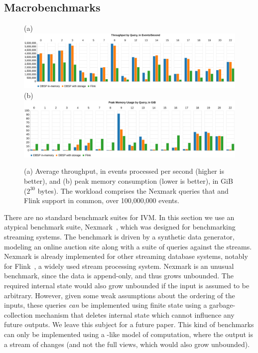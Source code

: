 \subsection{Macrobenchmarks}\label{sec:macrobenchmarks}

\begin{figure}
  (a) \includegraphics[width=.95\textwidth]{graph/throughput} \\
  (b) \includegraphics[width=.95\textwidth]{graph/memory} \\
  \caption{(a) Average throughput, in events processed per second
    (higher is better), and (b) peak memory consumption (lower is
    better), in GiB (\(2^{30}\) bytes).  The workload comprises the
    Nexmark queries that \dbsp and Flink support in common, over
    100,000,000 events.\label{fig:macrobenchmark}}
\end{figure}

There are no standard benchmark suites for IVM.  In this section we
use an atypical benchmark suite, Nexmark~\cite{tucker2008nexmark},
which was designed for benchmarking streaming systems.  The benchmark
is driven by a synthetic data generator, modeling an online
auction site along with a suite of queries against the streams.
Nexmark is already implemented for other streaming database systems,
notably for Flink~\cite{carbone-ieee15,nexmark-flink}, a widely used
stream processing system.  Nexmark is an unusual benchmark, since the
data is append-only, and thus grows unbounded.  The required internal
state would also grow unbounded if the input is assumed to be
arbitrary.  However, given some weak assumptions about the ordering of
the inputs, these queries \emph{can} be implemented using finite state
using a garbage-collection mechanism that deletes internal state which
cannot influence any future outputs.  We leave this subject for a
future paper.  This kind of benchmarks can only be implemented using a
\dbsp-like model of computation, where the output is a stream of
changes (and not the full views, which would also grow unbounded).

